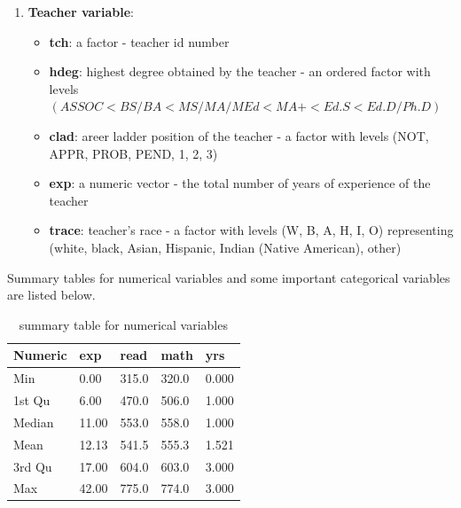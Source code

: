 \documentclass[11pt,a4paper]{article}
\begin{document}
\begin{enumerate}[1]
    \item \textbf{Teacher variable}:
        \begin{itemize}
            \item \textbf{tch}: a factor - teacher id number
            \item \textbf{hdeg}: highest degree obtained by the teacher - an ordered factor with levels $(ASSOC < BS/BA < MS/MA/MEd 
            < MA+ < Ed.S < Ed.D/Ph.D)$
            \item \textbf{clad}: areer ladder position of the teacher - a factor with levels (NOT, APPR, PROB, PEND, 1, 2, 3)
            \item \textbf{exp}: a numeric vector - the total number of years of experience of the teacher 
            \item \textbf{trace}: teacher’s race - a factor with levels (W, B, A, H, I, O) representing (white, black, Asian, 
            Hispanic, Indian (Native American), other)
        \end{itemize}

\end{enumerate}

Summary tables for numerical variables and some important categorical variables are listed below.

\begin{table}[h]
    \centering
    \caption{summary table for numerical variables}
    \label{table:numerical variables}
    \begin{tabular}{|l|l|l|l|l|}
    \hline
    Numeric & exp   & read  & math  & yrs   \\ \hline
    Min     & 0.00  & 315.0 & 320.0 & 0.000 \\ \hline
    1st Qu  & 6.00  & 470.0 & 506.0 & 1.000 \\ \hline
    Median  & 11.00 & 553.0 & 558.0 & 1.000 \\ \hline
    Mean    & 12.13 & 541.5 & 555.3 & 1.521 \\ \hline
    3rd Qu  & 17.00 & 604.0 & 603.0 & 3.000 \\ \hline
    Max     & 42.00 & 775.0 & 774.0 & 3.000 \\ \hline
    \end{tabular}
\end{table}
\end{document}

